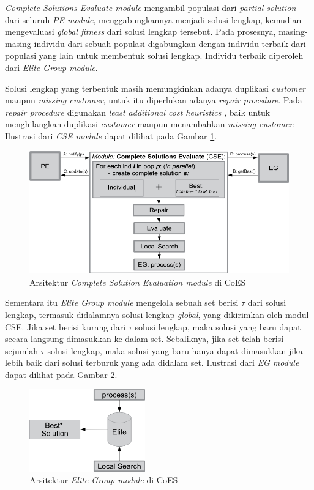 \textit{Complete Solutions Evaluate module} mengambil populasi dari \textit{partial solution} dari seluruh \textit{PE module}, menggabungkannya menjadi solusi lengkap, kemudian mengevaluasi \textit{global fitness} dari solusi lengkap tersebut. Pada prosesnya, masing-masing individu dari sebuah populasi digabungkan dengan individu terbaik dari populasi yang lain untuk membentuk solusi lengkap. Individu terbaik diperoleh dari \textit{Elite Group module}.


Solusi lengkap yang terbentuk masih memungkinkan adanya duplikasi \textit{customer} maupun \textit{missing customer}, untuk itu diperlukan adanya \textit{repair procedure}. Pada \textit{repair procedure} digunakan \textit{least additional cost heuristics} \citep{raff_routing_1983}, baik untuk menghilangkan duplikasi \textit{customer} maupun menambahkan \textit{missing customer}. Ilustrasi dari \textit{CSE module} dapat dilihat pada Gambar \ref{fig:coes_cse_module}.


\begin{figure}[!]
	\centering
	\includegraphics[width=\textwidth]{../../Resources/Images/coes_cse_module}
	\caption{Arsitektur \textit{Complete Solution Evaluation module} di CoES}
	\label{fig:coes_cse_module}
\end{figure}


Sementara itu \textit{Elite Group module} mengelola sebuah set berisi $\tau$ dari solusi lengkap, termasuk didalamnya solusi lengkap \textit{global}, yang dikirimkan oleh modul CSE. Jika set berisi kurang dari $\tau$ solusi lengkap, maka solusi yang baru dapat secara langsung dimasukkan ke dalam set. Sebaliknya, jika set telah berisi sejumlah $\tau$ solusi lengkap, maka solusi yang baru hanya dapat dimasukkan jika lebih baik dari solusi terburuk yang ada didalam set. Ilustrasi dari \textit{EG module} dapat dilihat pada Gambar \ref{fig:coes_eg_module}.


\begin{figure}[!]
	\centering
	\includegraphics[width=5cm]{../../Resources/Images/coes_eg_module}
	\caption{Arsitektur \textit{Elite Group module} di CoES}
	\label{fig:coes_eg_module}
\end{figure}


